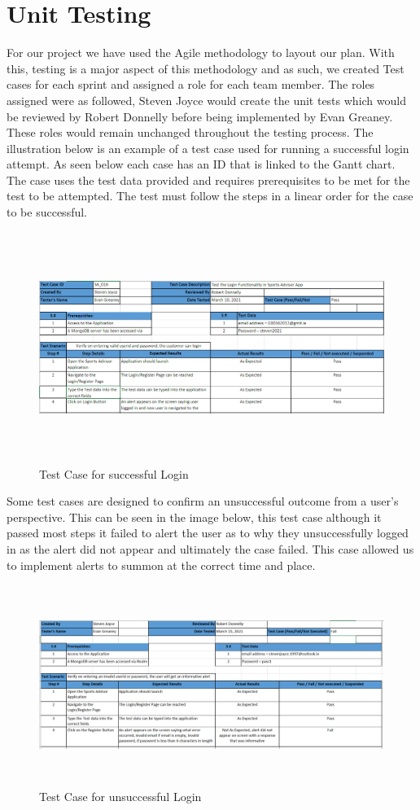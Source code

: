 \section{Unit Testing}
For our project we have used the Agile methodology to layout our plan. With this, testing is a major aspect of this methodology and as such, we created Test cases for each sprint and assigned a role for each team member. The roles assigned were as followed, Steven Joyce would create the unit tests which would be reviewed by Robert Donnelly before being implemented by Evan Greaney. These roles would remain unchanged throughout the testing process.
\newline
\newline
The illustration below is an example of a test case used for running a successful login attempt. As seen below each case has an ID that is linked to the Gantt chart. The case uses the test data provided and requires prerequisites to be met for the test to be attempted. The test must follow the steps in a linear order for the case to be successful.
\begin{figure}[H]
    \centering
    \includegraphics[width=15cm, height = 7.5cm]{img/TestCasePass.PNG}
    \caption{Test Case for successful Login}
    \label{fig:altas config}
\end{figure}
Some test cases are designed to confirm an unsuccessful outcome from a user's perspective. This can be seen in the image below, this test case although it passed most steps it failed to alert the user as to why they unsuccessfully logged in as the alert did not appear and ultimately the case failed. This case allowed us to implement alerts to summon at the correct time and place.
\begin{figure}[H]
    \centering
    \includegraphics[width=15cm, height = 6.5cm]{img/TestCaseFail.PNG}
    \caption{Test Case for unsuccessful Login}
    \label{fig:Test Case for unsuccessful Login}
\end{figure}
